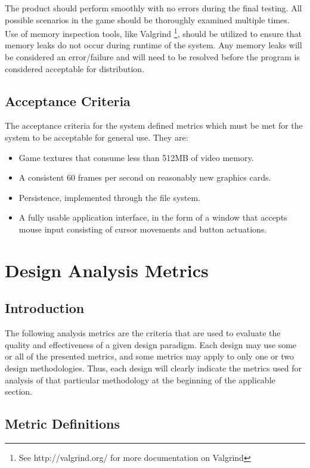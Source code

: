 \documentclass{article}
\begin{document}
    The product should perform smoothly with no errors during the final testing. All possible scenarios in the game should be thoroughly examined multiple times. Use of memory inspection tools, like Valgrind \footnote{See http://valgrind.org/ for more documentation on Valgrind}, should be utilized to ensure that memory leaks do not occur during runtime of the system. Any memory leaks will be considered an error/failure and will need to be resolved before the program is considered acceptable for distribution.
	\subsection{Acceptance Criteria}
		The acceptance criteria for the system defined metrics which must be met for the system to be acceptable for general use. They are:
		\begin{itemize}
			\item Game textures that consume less than 512MB of video memory.
      		\item A consistent 60 frames per second on reasonably new graphics cards.
			\item Persistence, implemented through the file system. 
			\item A fully usable application interface, in the form of a window that accepts mouse input consisting of cursor movements and button actuations.
		\end{itemize}
%
%
\section{Design Analysis Metrics}
	\subsection{Introduction}
		The following analysis metrics are the criteria that are used to evaluate the quality and effectiveness of a given design paradigm. Each design may use some or all of the presented metrics, and some metrics may apply to only one or two design methodologies. Thus, each design will clearly indicate the metrics used for analysis of that particular methodology at the beginning of the applicable section. 
	\subsection{Metric Definitions}
\end{document}
